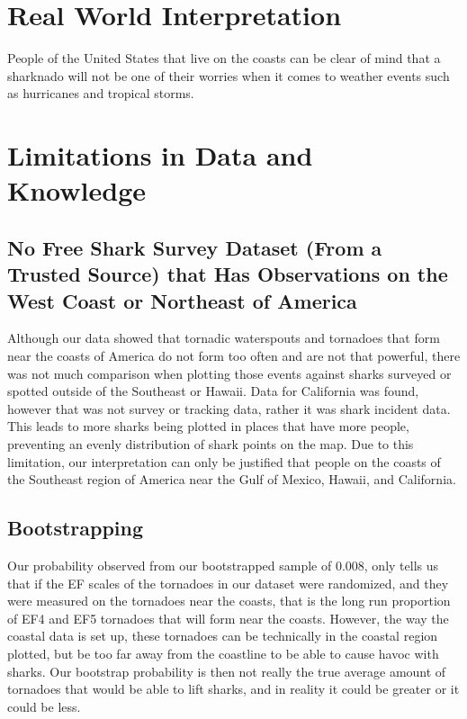 \documentclass[
  letterpaper,
  DIV=11,
  numbers=noendperiod]{scrreprt}
\begin{document}
\section{Real World Interpretation}\label{real-world-interpretation}

People of the United States that live on the coasts can be clear of mind
that a sharknado will not be one of their worries when it comes to
weather events such as hurricanes and tropical storms.

\section{Limitations in Data and
Knowledge}\label{limitations-in-data-and-knowledge}

\subsection{No Free Shark Survey Dataset (From a Trusted Source) that
Has Observations on the West Coast or Northeast of
America}\label{no-free-shark-survey-dataset-from-a-trusted-source-that-has-observations-on-the-west-coast-or-northeast-of-america}

Although our data showed that tornadic waterspouts and tornadoes that
form near the coasts of America do not form too often and are not that
powerful, there was not much comparison when plotting those events
against sharks surveyed or spotted outside of the Southeast or Hawaii.
Data for California was found, however that was not survey or tracking
data, rather it was shark incident data. This leads to more sharks being
plotted in places that have more people, preventing an evenly
distribution of shark points on the map. Due to this limitation, our
interpretation can only be justified that people on the coasts of the
Southeast region of America near the Gulf of Mexico, Hawaii, and
California.

\subsection{Bootstrapping}\label{bootstrapping}

Our probability observed from our bootstrapped sample of 0.008, only
tells us that if the EF scales of the tornadoes in our dataset were
randomized, and they were measured on the tornadoes near the coasts,
that is the long run proportion of EF4 and EF5 tornadoes that will form
near the coasts. However, the way the coastal data is set up, these
tornadoes can be technically in the coastal region plotted, but be too
far away from the coastline to be able to cause havoc with sharks. Our
bootstrap probability is then not really the true average amount of
tornadoes that would be able to lift sharks, and in reality it could be
greater or it could be less.
\end{document}
